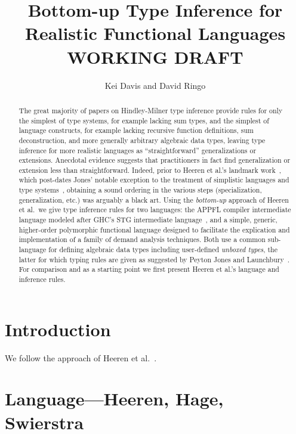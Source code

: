 \documentclass[11pt]{article}
\begin{document}

\title{Bottom-up Type Inference for Realistic Functional Languages\\ \Large{WORKING DRAFT}}
\author{Kei Davis and David Ringo}
\maketitle

\begin{abstract}
  The great majority of papers on Hindley-Milner type inference provide rules
  for only the simplest of type systems, for example lacking sum types, and
  the simplest of language constructs, for example lacking recursive function
  definitions, sum deconstruction, and more generally arbitrary algebraic data
  types, leaving type inference for more realistic languages as
  ``straightforward'' generalizations or extensions.  Anecdotal evidence
  suggests that practitioners in fact find generalization or extension less
  than straightforward.  Indeed, prior to Heeren et al.'s landmark
  work~\cite{HHS02}, which post-dates Jones' notable exception to the
  treatment of simplistic languages and type systems~\cite{Jones2000},
  obtaining a sound ordering in the various steps (specialization,
  generalization, etc.)  was arguably a black art.  Using the \emph{bottom-up}
  approach of Heeren et al.\ we give type inference rules for two languages:
  the APPFL compiler \cite{us} intermediate language modeled after GHC's STG
  intermediate language~\cite{PJ??}, and a simple, generic, higher-order
  polymorphic functional language designed to facilitate the explication and
  implementation of a family of demand analysis techniques.  Both use a common
  sub-language for defining algebraic data types including user-defined
  \emph{unboxed types}, the latter for which typing rules are given as
  suggested by Peyton Jones and Launchbury~\cite{PJL??}.  For comparison and
  as a starting point we first present Heeren et al.'s language and inference
  rules.
\end{abstract}


\section{Introduction}
We follow the approach of Heeren et al.~\cite{HHS02}.

\section{Language---Heeren, Hage, Swierstra}
\end{document}
